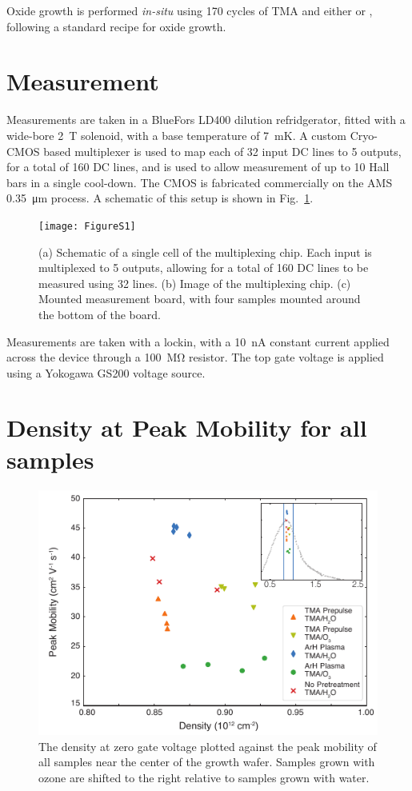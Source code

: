 Oxide growth is performed \emph{in-situ} using 170 cycles of TMA and either  or , following a standard recipe for oxide growth.

\section{\label{sec:surf_mulberry}Measurement}
Measurements are taken in a BlueFors LD400 dilution refridgerator, fitted with a wide-bore \SI{2}{\tesla} solenoid, with a base temperature of \SI{7}{\milli\kelvin}. A custom Cryo-CMOS based multiplexer is used to map each of 32 input DC lines to 5 outputs, for a total of 160 DC lines, and is used to allow measurement of up to 10 Hall bars in a single cool-down. The CMOS is fabricated commercially on the AMS \SI{0.35}{\micro\meter} process. A schematic of this setup is shown in Fig.~\ref{fig:surf_cmos}.

\begin{figure}
    \texttt{[image: FigureS1]}
    \caption[Measurement multiplexing setup]{\label{fig:surf_cmos} (a) Schematic of a single cell of the multiplexing chip. Each input is multiplexed to 5 outputs, allowing for a total of 160 DC lines to be measured using 32 lines. (b) Image of the multiplexing chip. (c) Mounted measurement board, with four samples mounted around the bottom of the board.}
\end{figure}

Measurements are taken with a lockin, with a \SI{10}{\nano\ampere} constant current applied across the device through a \SI{100}{\mega\ohm} resistor. The top gate voltage is applied using a Yokogawa GS200 voltage source.

\section{\label{sec:surf_mobden} Density at Peak Mobility for all samples}
\begin{figure}
    \includegraphics[width=0.65\linewidth]{FigureS2}
    \caption[Zero gate voltage density against peak mobility]{\label{fig:surf_mobden} The density at zero gate voltage plotted against the peak mobility of all samples near the center of the growth wafer. Samples grown with ozone are shifted to the right relative to samples grown with water.}
\end{figure}

